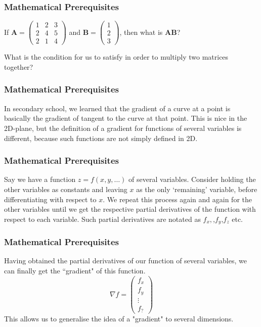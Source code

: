 \documentclass{beamer}
\begin{document}
\begin{frame}
\frametitle{Mathematical Prerequisites}
\begin{tcolorbox}
[colback=orange!5!white,colframe=orange!75!black,title=Exercise 1]
If $\textbf{A}=\begin{pmatrix}
    1&2&3\\
    2&4&5\\
    2&1&4
\end{pmatrix}$ and $\textbf{B}=\begin{pmatrix}
    1\\
    2\\
    3
\end{pmatrix}$, then what is $\textbf{AB}$?
\end{tcolorbox}
\begin{tcolorbox}
[colback=orange!5!white,colframe=orange!75!black,title=Exercise 2]
What is the condition for us to satisfy in order to multiply two matrices together?
\end{tcolorbox}
\end{frame}
\begin{frame}
\frametitle{Mathematical Prerequisites}
\begin{tcolorbox}
[colback=blue!5!white,colframe=blue!75!black,title = Gradient]
In secondary school, we learned that the gradient of a curve at a point is basically the gradient of tangent to the curve at that point. This is nice in the 2D-plane, but the definition of a gradient for functions of several variables is different, because such functions are not simply defined in 2D.
\end{tcolorbox}
\end{frame}
\begin{frame}
\frametitle{Mathematical Prerequisites}
\begin{tcolorbox}
[colback=blue!5!white,colframe=blue!75!black,title = Partial Differentiation]
Say we have a function $z=f(x,y,\dots)$ of several variables. Consider holding the other variables as constants and leaving $x$ as the only `remaining' variable, before differentiating with respect to $x$. We repeat this process again and again for the other variables until we get the respective partial derivatives of the function with respect to each variable. Such partial derivatives are notated as $f_x,$,$f_y$,$f_z$ etc.
\end{tcolorbox}
\end{frame}
\begin{frame}
\frametitle{Mathematical Prerequisites}
\begin{tcolorbox}
[colback=blue!5!white,colframe=blue!75!black,title = The Gradient Vector]
Having obtained the partial derivatives of our function of several variables, we can finally get the ``gradient" of this function. 
\[\nabla f=\begin{pmatrix}
    f_x\\
    f_y\\
    \vdots\\
    f_?
\end{pmatrix}\]
This allows us to generalise the idea of a "gradient" to several dimensions. 
\end{tcolorbox}
\end{frame}
\end{document}
